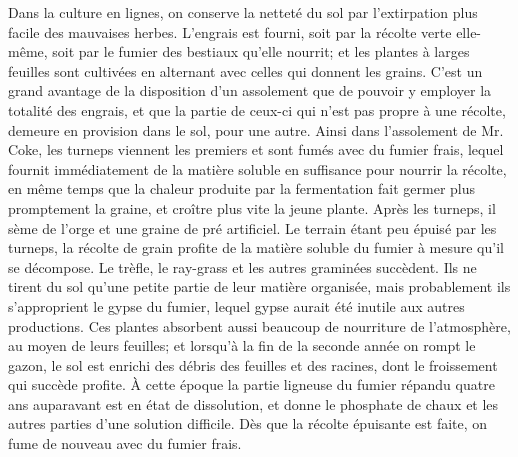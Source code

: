 Dans la culture en lignes, on conserve la netteté du sol par l'extirpation plus facile des mauvaises herbes. L'engrais est fourni, soit par la récolte verte elle-même, soit par le fumier des bestiaux qu'elle nourrit; et les plantes à larges feuilles sont cultivées en alternant avec celles qui donnent les grains. C'est un grand avantage de la disposition d'un assolement que de pouvoir y employer la totalité des engrais, et que la partie de ceux-ci qui n'est pas propre à une récolte, demeure en provision dans le sol, pour une autre. Ainsi dans l'assolement de Mr. Coke, les\setcounter{page}{283} turneps viennent les premiers et sont fumés avec du fumier frais, lequel fournit immédiatement de la matière soluble en suffisance pour nourrir la récolte, en même temps que la chaleur produite par la fermentation fait germer plus promptement la graine, et croître plus vite la jeune plante. Après les turneps, il sème de l'orge et une graine de pré artificiel. Le terrain étant peu épuisé par les turneps, la récolte de grain profite de la matière soluble du fumier à mesure qu'il se décompose. Le trèfle, le ray-grass et les autres graminées succèdent. Ils ne tirent du sol qu'une petite partie de leur matière organisée, mais probablement ils s'approprient le gypse du fumier, lequel gypse aurait été inutile aux autres productions. Ces plantes absorbent aussi beaucoup de nourriture de l'atmosphère, au moyen de leurs feuilles; et lorsqu'à la fin de la seconde année on rompt le gazon, le sol est enrichi des débris des feuilles et des racines, dont le froissement qui succède profite. À cette époque la partie ligneuse du fumier répandu quatre ans auparavant est en état de dissolution, et donne le phosphate de chaux et les autres parties d'une solution difficile. Dès que la récolte épuisante est faite, on fume de nouveau avec du fumier frais.
